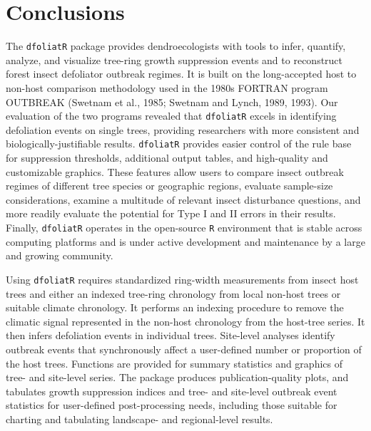 \documentclass[review]{elsarticle} %
\newenvironment{Shaded}{\begin{snugshade}}{\end{snugshade}}
\newcommand{\CommentTok}[1]{\textcolor[rgb]{0.56,0.35,0.01}{\textit{#1}}}
\newcommand{\KeywordTok}[1]{\textcolor[rgb]{0.13,0.29,0.53}{\textbf{#1}}}
\newcommand{\NormalTok}[1]{#1}
\newcommand{\OperatorTok}[1]{\textcolor[rgb]{0.81,0.36,0.00}{\textbf{#1}}}
\newcommand{\StringTok}[1]{\textcolor[rgb]{0.31,0.60,0.02}{#1}}
\begin{document}
\begin{Shaded}
\end{Shaded}

\hypertarget{conclusions}{%
\section{Conclusions}\label{conclusions}}

The \texttt{dfoliatR} package provides dendroecologists with tools to infer, quantify, analyze, and visualize tree-ring growth suppression events and to reconstruct forest insect defoliator outbreak regimes. It is built on the long-accepted host to non-host comparison methodology used in the 1980s FORTRAN program OUTBREAK (Swetnam et al., 1985; Swetnam and Lynch, 1989, 1993). Our evaluation of the two programs revealed that \texttt{dfoliatR} excels in identifying defoliation events on single trees, providing researchers with more consistent and biologically-justifiable results. \texttt{dfoliatR} provides easier control of the rule base for suppression thresholds, additional output tables, and high-quality and customizable graphics. These features allow users to compare insect outbreak regimes of different tree species or geographic regions, evaluate sample-size considerations, examine a multitude of relevant insect disturbance questions, and more readily evaluate the potential for Type I and II errors in their results. Finally, \texttt{dfoliatR} operates in the open-source \texttt{R} environment that is stable across computing platforms and is under active development and maintenance by a large and growing community.

Using \texttt{dfoliatR} requires standardized ring-width measurements from insect host trees and either an indexed tree-ring chronology from local non-host trees or suitable climate chronology. It performs an indexing procedure to remove the climatic signal represented in the non-host chronology from the host-tree series. It then infers defoliation events in individual trees. Site-level analyses identify outbreak events that synchronously affect a user-defined number or proportion of the host trees. Functions are provided for summary statistics and graphics of tree- and site-level series. The package produces publication-quality plots, and tabulates growth suppression indices and tree- and site-level outbreak event statistics for user-defined post-processing needs, including those suitable for charting and tabulating landscape- and regional-level results.
\end{document}
